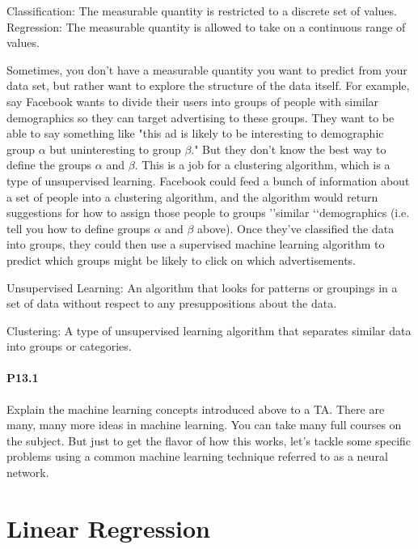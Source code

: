 Classification: The measurable quantity is restricted to a discrete set of values.
Regression: The measurable quantity is allowed to take on a continuous range of values.

Sometimes, you don\rq t have a measurable quantity you want to predict from your data set, but rather want to explore the structure of the data itself. For example, say Facebook wants to divide their users into groups of people with similar demographics so they can target advertising to these groups. They want to be able to say something like "this ad is likely to be interesting to demographic group $\alpha$ but uninteresting to group $\beta$." But they don\rq t know the best way to define the groups $\alpha$ and $\beta$. This is a job for a clustering algorithm, which is a type of unsupervised learning. Facebook could feed a bunch of information about a set of people into a clustering algorithm, and the algorithm would return suggestions for how to assign those people to groups \rq\rq similar \lq\lq demographics (i.e. tell you how to define groups $\alpha$ and $\beta$ above). Once they\rq ve classified the data into groups, they could then use a supervised machine learning algorithm to predict which groups might be likely to click on which advertisements.

Unsupervised Learning: An algorithm that looks for patterns or groupings in a set of data without respect to any presuppositions about the data.

Clustering: A type of unsupervised learning algorithm that separates similar data into groups or categories.

\paragraph*{P13.1} Explain the machine learning concepts introduced above to a TA.
There are many, many more ideas in machine learning. You can take many full courses on the subject. But just to get the flavor of how this works, let\rq s tackle some specific problems using a common machine learning technique referred to as a neural network.


\section*{Linear Regression}

